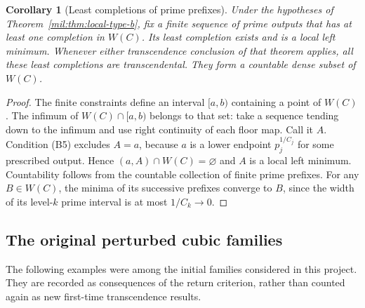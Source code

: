 \documentclass[11pt,a4paper]{article}
\newtheorem{corollary}[theorem]{Corollary}
\theoremstyle{definition}
\theoremstyle{remark}
\numberwithin{equation}{section}
\begin{document}
\begin{corollary}[Least completions of prime prefixes]
Under the hypotheses of Theorem~\ref{mil:thm:local-type-b}, fix a finite sequence of prime outputs that has at least one completion in $W(C)$. Its least completion exists and is a local left minimum. Whenever either transcendence conclusion of that theorem applies, all these least completions are transcendental. They form a countable dense subset of $W(C)$.
\end{corollary}

\begin{proof}
The finite constraints define an interval $[a,b)$ containing a point of $W(C)$. The infimum of $W(C)\cap[a,b)$ belongs to that set: take a sequence tending down to the infimum and use right continuity of each floor map. Call it $A$. Condition (B5) excludes $A=a$, because $a$ is a lower endpoint $p_j^{1/C_j}$ for some prescribed output. Hence $(a,A)\cap W(C)=\varnothing$ and $A$ is a local left minimum. Countability follows from the countable collection of finite prime prefixes. For any $B\in W(C)$, the minima of its successive prefixes converge to $B$, since the width of its level-$k$ prime interval is at most $1/C_k\to0$.
\end{proof}

\subsection{The original perturbed cubic families}

The following examples were among the initial families considered in this
project. They are recorded as consequences of the return criterion, rather
than counted again as new first-time transcendence results.
\end{document}

